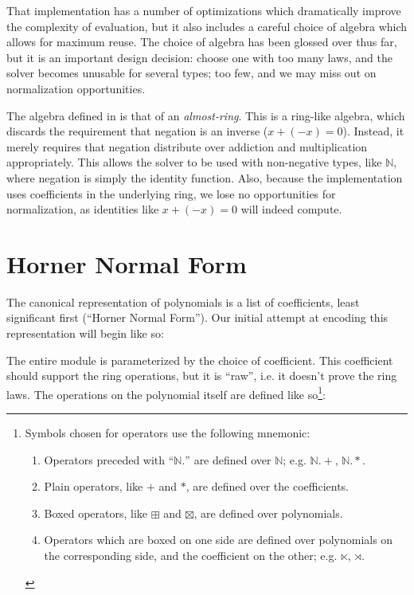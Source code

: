 \documentclass[draft, twocolumn]{article}
\begin{document}
That implementation has a number of optimizations which dramatically improve the
complexity of evaluation, but it also includes a careful choice of algebra which
allows for maximum reuse. The choice of algebra has been glossed over thus far,
but it is an important design decision: choose one with too many laws, and the
solver becomes unusable for several types; too few, and we may miss out on
normalization opportunities.

The algebra defined in \cite{hutchison_proving_2005} is that of an
\emph{almost-ring}. This is a ring-like algebra, which discards the requirement
that negation is an inverse (\(x + (-x) = 0\)). Instead, it merely requires that
negation distribute over addiction and multiplication appropriately. This
allows the solver to be used with non-negative types, like \(\mathbb{N}\), where
negation is simply the identity function. Also, because the implementation uses
coefficients in the underlying ring, we lose no opportunities for normalization,
as identities like \(x + (-x) = 0\) will indeed compute.
\section{Horner Normal Form}
The canonical representation of polynomials is a list of coefficients, least
significant first (``Horner Normal Form''). Our initial attempt at encoding this
representation will begin like so:

The entire module is parameterized by the choice of coefficient. This
coefficient should support the ring operations, but it is ``raw'', i.e. it
doesn't prove the ring laws. The operations on the polynomial itself are defined
like so\footnote{
  Symbols chosen for operators use the following mnemonic:
  \begin{enumerate}
    \item Operators preceded with ``\(\mathbb{N}.\)'' are defined over
      \(\mathbb{N}\); e.g. \(\mathbb{N}.+\), \(\mathbb{N}.*\).
    \item Plain operators, like \(+\) and \(*\), are defined over the
      coefficients.
    \item Boxed operators, like \(\boxplus\) and \(\boxtimes\), are defined over
      polynomials.
    \item Operators which are boxed on one side are defined over polynomials on
      the corresponding side, and the coefficient on the other; e.g.
      \(\ltimes\), \(\rtimes\).
  \end{enumerate}
}:
\end{document}
